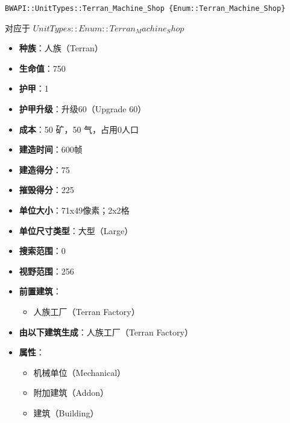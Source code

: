 \begin{tcolorbox}[colback=white, colframe=black!60!white, title=Terran\_Machine\_Shop(), arc=0mm]
    \begin{verbatim}
BWAPI::UnitTypes::Terran_Machine_Shop {Enum::Terran_Machine_Shop}
    \end{verbatim}
    对应于  $ UnitTypes::Enum::Terran_Machine_Shop $ 
    \begin{itemize}
        \item \textbf{种族}：人族（Terran）
        \item \textbf{生命值}：750
        \item \textbf{护甲}：1
        \item \textbf{护甲升级}：升级60（Upgrade 60）
        \item \textbf{成本}：50 矿，50 气，占用0人口
        \item \textbf{建造时间}：600帧
        \item \textbf{建造得分}：75
        \item \textbf{摧毁得分}：225
        \item \textbf{单位大小}：71x49像素；2x2格
        \item \textbf{单位尺寸类型}：大型（Large）
        \item \textbf{搜索范围}：0
        \item \textbf{视野范围}：256
        \item \textbf{前置建筑}：
            \begin{itemize}
                \item 人族工厂（Terran Factory）
            \end{itemize}
        \item \textbf{由以下建筑生成}：人族工厂（Terran Factory）
        \item \textbf{属性}：
            \begin{itemize}
                \item 机械单位（Mechanical）
                \item 附加建筑（Addon）
                \item 建筑（Building）
            \end{itemize}
    \end{itemize}
\end{tcolorbox}

